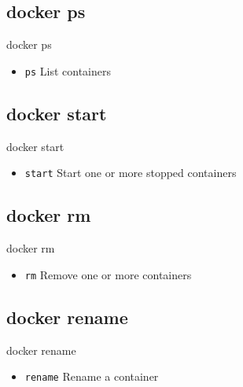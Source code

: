 \subsection{docker ps}\label{subsec:docker-ps}
\begin{frame}{docker ps}
    \begin{itemize}
        \item \texttt{ps} List containers
        \pause
        
    \end{itemize}
\end{frame}

\subsection{docker start}\label{subsec:docker-start}
\begin{frame}{docker start}
    \begin{itemize}
        \item \texttt{start} Start one or more stopped containers
        \pause
        
    \end{itemize}
\end{frame}

\subsection{docker rm}\label{subsec:docker-rm}
\begin{frame}{docker rm}
    \begin{itemize}
        \item \texttt{rm} Remove one or more containers
        \pause
        
    \end{itemize}
\end{frame}

\subsection{docker rename}\label{subsec:docker-rename}
\begin{frame}{docker rename}
    \begin{itemize}
        \item \texttt{rename} Rename a container
        \pause
        
    \end{itemize}
\end{frame}

